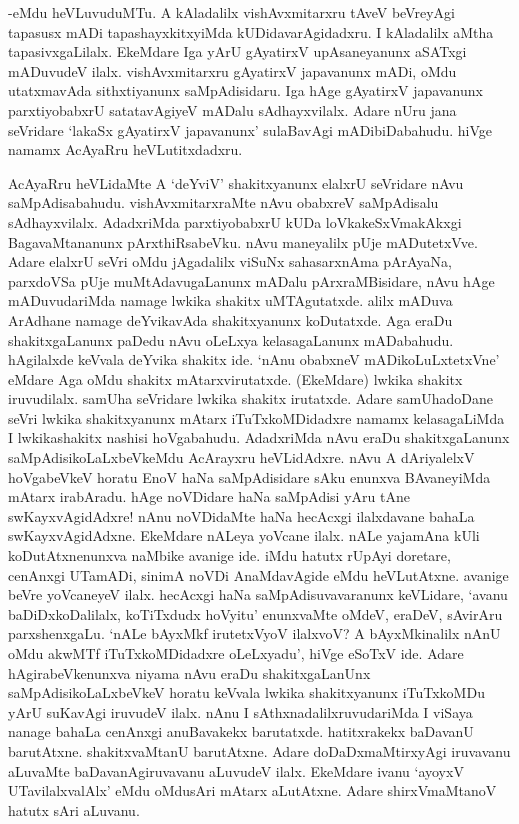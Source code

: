 -eMdu heVLuvuduMTu. A kAladalilx vishAvxmitarxru tAveV beVreyAgi tapasusx mADi tapashayxkitxyiMda kUDidavarAgidadxru. I kAladalilx aMtha tapasivxgaLilalx. EkeMdare Iga yArU gAyatirxV upAsaneyanunx aSATxgi mADuvudeV ilalx. vishAvxmitarxru gAyatirxV japavanunx mADi, oMdu utatxmavAda sithxtiyanunx saMpAdisidaru. Iga hAge gAyatirxV japavanunx parxtiyobabxrU satatavAgiyeV mADalu sAdhayxvilalx. Adare nUru jana seVridare `lakaSx gAyatirxV japavanunx' sulaBavAgi mADibiDabahudu. hiVge namamx AcAyaRru heVLutitxdadxru.

AcAyaRru heVLidaMte A `deYviV' shakitxyanunx elalxrU seVridare nAvu saMpAdisabahudu. vishAvxmitarxraMte nAvu obabxreV saMpAdisalu sAdhayxvilalx. AdadxriMda parxtiyobabxrU kUDa loVkakeSxVmakAkxgi BagavaMtananunx pArxthiRsabeVku. nAvu maneyalilx pUje mADutetxVve. Adare elalxrU seVri oMdu jAgadalilx viSuNx sahasarxnAma pArAyaNa, parxdoVSa pUje muMtAdavugaLanunx mADalu pArxraMBisidare, nAvu hAge mADuvudariMda namage lwkika shakitx uMTAgutatxde. alilx mADuva ArAdhane namage deYvikavAda shakitxyanunx koDutatxde. Aga eraDu shakitxgaLanunx paDedu nAvu oLeLxya kelasagaLanunx mADabahudu. hAgilalxde keVvala deYvika shakitx ide. `nAnu obabxneV mADikoLuLxtetxVne' eMdare Aga oMdu shakitx mAtarxvirutatxde. (EkeMdare) lwkika shakitx iruvudilalx. samUha seVridare lwkika shakitx irutatxde. Adare samUhadoDane seVri lwkika shakitxyanunx mAtarx iTuTxkoMDidadxre namamx kelasagaLiMda I lwkikashakitx nashisi hoVgabahudu. AdadxriMda nAvu eraDu shakitxgaLanunx saMpAdisikoLaLxbeVkeMdu AcArayxru heVLidAdxre. nAvu A dAriyalelxV hoVgabeVkeV horatu EnoV haNa saMpAdisidare sAku enunxva BAvaneyiMda mAtarx irabAradu. hAge noVDidare haNa saMpAdisi yAru tAne swKayxvAgidAdxre! nAnu noVDidaMte haNa hecAcxgi ilalxdavane bahaLa swKayxvAgidAdxne. EkeMdare nALeya yoVcane ilalx. nALe yajamAna kUli koDutAtxnenunxva naMbike avanige ide. iMdu hatutx rUpAyi doretare, cenAnxgi UTamADi, sinimA noVDi AnaMdavAgide eMdu heVLutAtxne. avanige beVre yoVcaneyeV ilalx. hecAcxgi haNa saMpAdisuvavaranunx keVLidare, `avanu baDiDxkoDalilalx, koTiTxdudx hoVyitu' enunxvaMte oMdeV, eraDeV, sAvirAru parxshenxgaLu. `nALe bAyxMkf irutetxVyoV ilalxvoV? A bAyxMkinalilx nAnU oMdu akwMTf iTuTxkoMDidadxre oLeLxyadu', hiVge eSoTxV ide. Adare hAgirabeVkenunxva niyama nAvu eraDu shakitxgaLanUnx saMpAdisikoLaLxbeVkeV horatu keVvala lwkika shakitxyanunx iTuTxkoMDu yArU suKavAgi iruvudeV ilalx. nAnu I sAthxnadalilxruvudariMda I viSaya nanage bahaLa cenAnxgi anuBavakekx barutatxde. hatitxrakekx baDavanU barutAtxne. shakitxvaMtanU barutAtxne. Adare doDaDxmaMtirxyAgi iruvavanu aLuvaMte baDavanAgiruvavanu aLuvudeV ilalx. EkeMdare ivanu `ayoyxV UTavilalxvalAlx' eMdu oMdusAri mAtarx aLutAtxne. Adare shirxVmaMtanoV hatutx sAri aLuvanu.

